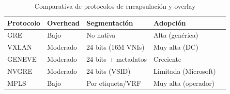 \begin{table}[H]
\centering
\caption{Comparativa de protocolos de encapsulación y overlay}
\label{tab:protocolos}
\begin{tabular}{@{}lllll@{}}
\toprule
\textbf{Protocolo} & \textbf{Overhead} & \textbf{Segmentación}  & \textbf{Adopción} \\
\midrule
GRE    & Bajo      & No nativa            & Alta (genérica)      \\
VXLAN  & Moderado  & 24 bits (16M VNIs)   & Muy alta (DC)        \\
GENEVE & Moderado  & 24 bits + metadatos  & Creciente            \\
NVGRE  & Moderado  & 24 bits (VSID)       & Limitada (Microsoft) \\
MPLS   & Bajo      & Por etiqueta/VRF     & Muy alta (operador)  \\
\bottomrule
\end{tabular}
\end{table}
